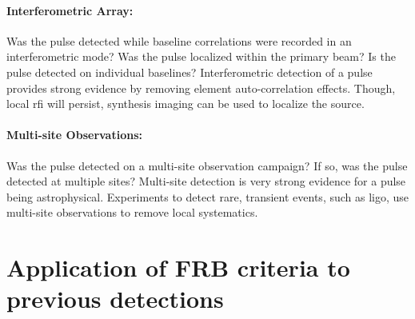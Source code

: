\documentclass[a4paper,fleqn,usenatbib]{mnras}
\begin{document}
\paragraph{Interferometric Array:}

Was the pulse detected while baseline correlations were recorded in an
interferometric mode? Was the pulse localized within the primary beam? Is the
pulse detected on individual baselines? Interferometric detection of a pulse
provides strong evidence by removing element auto-correlation effects. Though,
local \gls{rfi} will persist, synthesis imaging can be used to localize the
source.

\paragraph{Multi-site Observations:}

Was the pulse detected on a multi-site observation campaign? If so, was the
pulse detected at multiple sites? Multi-site detection is very strong evidence
for a pulse being astrophysical. Experiments to detect rare, transient events,
such as \gls{ligo}, use multi-site observations to remove local systematics.

\section{Application of FRB criteria to previous detections}
\end{document}
